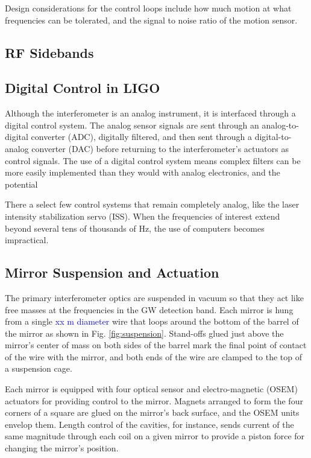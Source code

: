 Design considerations for the control loops include how much motion at
what frequencies can be tolerated, and the signal to noise ratio of
the motion sensor.


\subsection{RF Sidebands}



\subsection{Digital Control in LIGO}
Although the interferometer is an analog instrument, it is interfaced
through a digital control system. The analog sensor signals are sent
through an analog-to-digital converter (ADC), digitally filtered, and
then sent through a digital-to-analog converter (DAC) before returning
to the interferometer's actuators as control signals. The use of a digital
control system means complex filters can be more easily implemented
than they would with analog electronics, and the potential 

There a select few control systems that remain completely analog, like
the laser intensity stabilization servo (ISS). When the frequencies of
interest extend beyond several tens of thousands of Hz, the use of
computers becomes impractical.




\subsection{Mirror Suspension and Actuation}
\label{sec:suspension}
The primary interferometer optics are suspended in vacuum so that they
act like free masses at the frequencies in the GW detection band. Each
mirror is hung from a single \textcolor{blue}{xx m diameter} wire that
loops around the bottom of the barrel of the mirror as shown in
Fig. \ref{fig:suspension}. Stand-offs glued just above the mirror's
center of mass on both sides of the barrel mark the final point of
contact of the wire with the mirror, and both ends of the wire are
clamped to the top of a suspension cage.

Each mirror is equipped with four optical sensor and electro-magnetic
(OSEM) actuators for providing control to the mirror. Magnets arranged
to form the four corners of a square are glued on the mirror's back
surface, and the OSEM units envelop them. Length control of the
cavities, for instance, sends current of the same magnitude through
each coil on a given mirror to provide a piston force for changing the
mirror's position.

